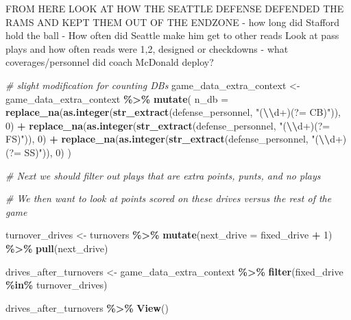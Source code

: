 \documentclass[
]{article}
\newenvironment{Shaded}{\begin{snugshade}}{\end{snugshade}}
\newcommand{\AttributeTok}[1]{\textcolor[rgb]{0.13,0.29,0.53}{#1}}
\newcommand{\CommentTok}[1]{\textcolor[rgb]{0.56,0.35,0.01}{\textit{#1}}}
\newcommand{\DecValTok}[1]{\textcolor[rgb]{0.00,0.00,0.81}{#1}}
\newcommand{\FunctionTok}[1]{\textcolor[rgb]{0.13,0.29,0.53}{\textbf{#1}}}
\newcommand{\NormalTok}[1]{#1}
\newcommand{\OtherTok}[1]{\textcolor[rgb]{0.56,0.35,0.01}{#1}}
\newcommand{\SpecialCharTok}[1]{\textcolor[rgb]{0.81,0.36,0.00}{\textbf{#1}}}
\newcommand{\StringTok}[1]{\textcolor[rgb]{0.31,0.60,0.02}{#1}}
\begin{document}
FROM HERE LOOK AT HOW THE SEATTLE DEFENSE DEFENDED THE RAMS AND KEPT
THEM OUT OF THE ENDZONE - how long did Stafford hold the ball - How
often did Seattle make him get to other reads Look at pass plays and how
often reads were 1,2, designed or checkdowns - what coverages/personnel
did coach McDonald deploy?

\begin{Shaded}
\begin{Highlighting}[]
\CommentTok{\# slight modification for counting DBs}
\NormalTok{game\_data\_extra\_context }\OtherTok{\textless{}{-}}\NormalTok{ game\_data\_extra\_context }\SpecialCharTok{\%\textgreater{}\%}
  \FunctionTok{mutate}\NormalTok{(}
    \AttributeTok{n\_db =} \FunctionTok{replace\_na}\NormalTok{(}\FunctionTok{as.integer}\NormalTok{(}\FunctionTok{str\_extract}\NormalTok{(defense\_personnel, }\StringTok{"(}\SpecialCharTok{\textbackslash{}\textbackslash{}}\StringTok{d+)(?= CB)"}\NormalTok{)), }\DecValTok{0}\NormalTok{) }\SpecialCharTok{+}
           \FunctionTok{replace\_na}\NormalTok{(}\FunctionTok{as.integer}\NormalTok{(}\FunctionTok{str\_extract}\NormalTok{(defense\_personnel, }\StringTok{"(}\SpecialCharTok{\textbackslash{}\textbackslash{}}\StringTok{d+)(?= FS)"}\NormalTok{)), }\DecValTok{0}\NormalTok{) }\SpecialCharTok{+}
           \FunctionTok{replace\_na}\NormalTok{(}\FunctionTok{as.integer}\NormalTok{(}\FunctionTok{str\_extract}\NormalTok{(defense\_personnel, }\StringTok{"(}\SpecialCharTok{\textbackslash{}\textbackslash{}}\StringTok{d+)(?= SS)"}\NormalTok{)), }\DecValTok{0}\NormalTok{)}
\NormalTok{  )}

\CommentTok{\# Next we should filter out plays that are extra points, punts, and no plays}

\CommentTok{\# We then want to look at points scored on these drives versus the rest of the game}
\end{Highlighting}
\end{Shaded}

\begin{Shaded}
\begin{Highlighting}[]
\NormalTok{turnover\_drives }\OtherTok{\textless{}{-}}\NormalTok{ turnovers }\SpecialCharTok{\%\textgreater{}\%}
  \FunctionTok{mutate}\NormalTok{(}\AttributeTok{next\_drive =}\NormalTok{ fixed\_drive }\SpecialCharTok{+} \DecValTok{1}\NormalTok{) }\SpecialCharTok{\%\textgreater{}\%}
  \FunctionTok{pull}\NormalTok{(next\_drive)}

\NormalTok{drives\_after\_turnovers }\OtherTok{\textless{}{-}}\NormalTok{ game\_data\_extra\_context }\SpecialCharTok{\%\textgreater{}\%}
  \FunctionTok{filter}\NormalTok{(fixed\_drive }\SpecialCharTok{\%in\%}\NormalTok{ turnover\_drives)}

\NormalTok{drives\_after\_turnovers }\SpecialCharTok{\%\textgreater{}\%} \FunctionTok{View}\NormalTok{()}
\end{Highlighting}
\end{Shaded}
\end{document}
